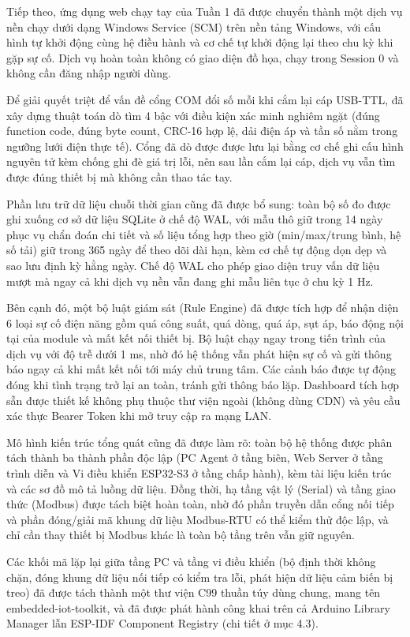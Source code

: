 \documentclass[12pt,a4paper]{article}
\begin{document}
Tiếp theo, ứng dụng web chạy tay của Tuần 1 đã được chuyển thành một dịch vụ nền chạy dưới dạng Windows Service (SCM) trên nền tảng Windows, với cấu hình tự khởi động cùng hệ điều hành và cơ chế tự khởi động lại theo chu kỳ khi gặp sự cố. Dịch vụ hoàn toàn không có giao diện đồ họa, chạy trong Session 0 và không cần đăng nhập người dùng.

Để giải quyết triệt để vấn đề cổng COM đổi số mỗi khi cắm lại cáp USB-TTL, đã xây dựng thuật toán dò tìm 4 bậc với điều kiện xác minh nghiêm ngặt (đúng function code, đúng byte count, CRC-16 hợp lệ, dải điện áp và tần số nằm trong ngưỡng lưới điện thực tế). Cổng đã dò được được lưu lại bằng cơ chế ghi cấu hình nguyên tử kèm chống ghi đè giá trị lỗi, nên sau lần cắm lại cáp, dịch vụ vẫn tìm được đúng thiết bị mà không cần thao tác tay.

Phần lưu trữ dữ liệu chuỗi thời gian cũng đã được bổ sung: toàn bộ số đo được ghi xuống cơ sở dữ liệu SQLite ở chế độ WAL, với mẫu thô giữ trong 14 ngày phục vụ chẩn đoán chi tiết và số liệu tổng hợp theo giờ (min/max/trung bình, hệ số tải) giữ trong 365 ngày để theo dõi dài hạn, kèm cơ chế tự động dọn dẹp và sao lưu định kỳ hằng ngày. Chế độ WAL cho phép giao diện truy vấn dữ liệu mượt mà ngay cả khi dịch vụ nền vẫn đang ghi mẫu liên tục ở chu kỳ 1 Hz.

Bên cạnh đó, một bộ luật giám sát (Rule Engine) đã được tích hợp để nhận diện 6 loại sự cố điện năng gồm quá công suất, quá dòng, quá áp, sụt áp, báo động nội tại của module và mất kết nối thiết bị. Bộ luật chạy ngay trong tiến trình của dịch vụ với độ trễ dưới 1 ms, nhờ đó hệ thống vẫn phát hiện sự cố và gửi thông báo ngay cả khi mất kết nối tới máy chủ trung tâm. Các cảnh báo được tự động đóng khi tình trạng trở lại an toàn, tránh gửi thông báo lặp. Dashboard tích hợp sẵn được thiết kế không phụ thuộc thư viện ngoài (không dùng CDN) và yêu cầu xác thực Bearer Token khi mở truy cập ra mạng LAN.

Mô hình kiến trúc tổng quát cũng đã được làm rõ: toàn bộ hệ thống được phân tách thành ba thành phần độc lập (PC Agent ở tầng biên, Web Server ở tầng trình diễn và Vi điều khiển ESP32-S3 ở tầng chấp hành), kèm tài liệu kiến trúc và các sơ đồ mô tả luồng dữ liệu. Đồng thời, hạ tầng vật lý (Serial) và tầng giao thức (Modbus) được tách biệt hoàn toàn, nhờ đó phần truyền dẫn cổng nối tiếp và phần đóng/giải mã khung dữ liệu Modbus-RTU có thể kiểm thử độc lập, và chỉ cần thay thiết bị Modbus khác là toàn bộ tầng trên vẫn giữ nguyên.

Các khối mã lặp lại giữa tầng PC và tầng vi điều khiển (bộ định thời không chặn, đóng khung dữ liệu nối tiếp có kiểm tra lỗi, phát hiện dữ liệu cảm biến bị treo) đã được tách thành một thư viện C99 thuần túy dùng chung, mang tên embedded-iot-toolkit, và đã được phát hành công khai trên cả Arduino Library Manager lẫn ESP-IDF Component Registry (chi tiết ở mục 4.3).
\end{document}
